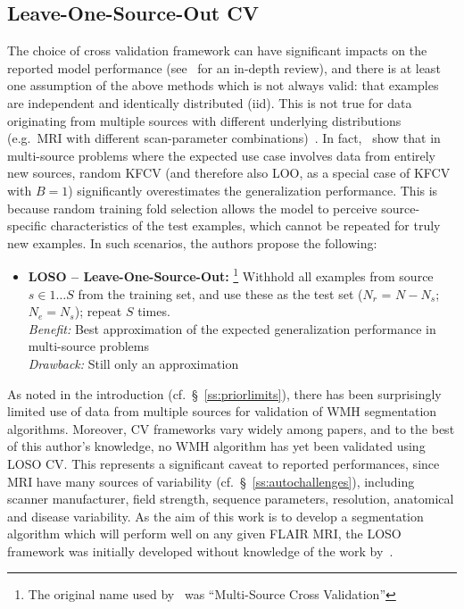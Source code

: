 \subsection{Leave-One-Source-Out CV}
The choice of cross validation framework can have significant impacts
on the reported model performance (see~\cite{Arlot2010} for an in-depth review),
and there is at least one assumption of the above methods which is not always valid:
that examples are independent and identically distributed (iid).
This is not true for data originating from multiple sources with different underlying distributions
(e.g.\ MRI with different scan-parameter combinations)~\cite{Geras2013}.
In fact,~\citeauthor{Geras2013} show that in multi-source problems
where the expected use case involves data from entirely new sources,
random KFCV (and therefore also LOO, as a special case of KFCV with $B=1$)
significantly overestimates the generalization performance.
This is because random training fold selection allows the model
to perceive source-specific characteristics of the test examples,
which cannot be repeated for truly new examples.
In such scenarios, the authors propose the following:
\begin{itemize}
  \item\textbf{LOSO -- Leave-One-Source-Out:}%
  \footnote{The original name used by~\citeauthor{Geras2013} %
    was ``Multi-Source Cross Validation''}
  Withhold all examples from source $s\in 1\dots S$ from the training set,
  and use these as the test set ($N_r$ = $N-N_s$; $N_e = N_s$);
  repeat $S$ times.
  \\\textit{Benefit:} Best approximation of the expected generalization performance
  in multi-source problems
  \\\textit{Drawback:} Still only an approximation
\end{itemize}
As noted in the introduction (cf.~\S~\ref{ss:priorlimits}),
there has been surprisingly limited use of data from multiple sources
for validation of WMH segmentation algorithms.
Moreover, CV frameworks vary widely among papers, and to the best of this author's knowledge,
no WMH algorithm has yet been validated using LOSO CV.
This represents a significant caveat to reported performances,
since MRI have many sources of variability (cf.~\S~\ref{ss:autochallenges}),
including scanner manufacturer, field strength, sequence parameters, resolution,
anatomical and disease variability.
As the aim of this work is to develop a segmentation algorithm
which will perform well on any given FLAIR MRI,
the LOSO framework was initially developed without knowledge of the work by~\citeauthor{Geras2013}.
